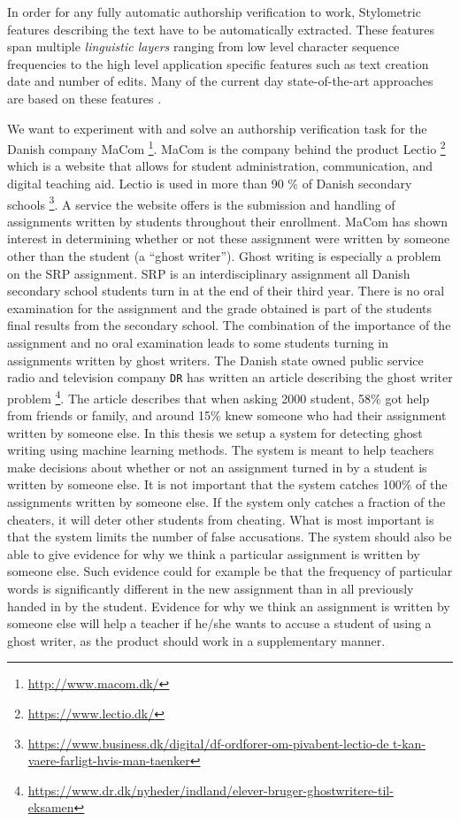 In order for any fully automatic authorship verification to work, Stylometric
features describing the text have to be automatically extracted. These features
span multiple \textit{linguistic layers} ranging from low level character
sequence frequencies to the high level application specific features such as
text creation date and number of edits. Many of the current day state-of-the-art
approaches are based on these features \citep{stamatos2009}.


We want to experiment with and solve an authorship verification task for the
Danish company MaCom \footnote{\url{http://www.macom.dk/}}. MaCom is the company
behind the product Lectio \footnote{\url{https://www.lectio.dk/}} which is a
website that allows for student administration, communication, and digital
teaching aid. Lectio is used in more than 90 \% of Danish secondary schools
\footnote{\url{https://www.business.dk/digital/df-ordforer-om-pivabent-lectio-de
t-kan-vaere-farligt-hvis-man-taenker}}. A service the website offers is the
submission and handling of assignments written by students throughout their
enrollment. MaCom has shown interest in determining whether or not these
assignment were written by someone other than the student (a ``ghost writer'').
Ghost writing is especially a problem on the \gls{SRP} assignment. \gls{SRP}
is an interdisciplinary assignment all Danish secondary school students turn
in at the end of their third year. There is no oral examination for the
assignment and the grade obtained is part of the students final results from
the secondary school. The combination of the importance of the assignment and
no oral examination leads to some students turning in assignments written by
ghost writers. The Danish state owned public service radio and television
company \texttt{DR} has written an article describing the ghost writer problem
\footnote{\url{https://www.dr.dk/nyheder/indland/elever-bruger-ghostwritere-til-
eksamen}}. The article describes that when asking 2000 student, 58\% got help
from friends or family, and around 15\% knew someone who had their assignment
written by someone else. In this thesis we setup a system for detecting ghost
writing using machine learning methods. The system is meant to help teachers
make decisions about whether or not an assignment turned in by a student is
written by someone else. It is not important that the system catches 100\% of
the assignments written by someone else. If the system only catches a fraction
of the cheaters, it will deter other students from cheating. What is most
important is that the system limits the number of false accusations. The system
should also be able to give evidence for why we think a particular assignment is
written by someone else. Such evidence could for example be that the frequency
of particular words is significantly different in the new assignment than in all
previously handed in by the student. Evidence for why we think an assignment is
written by someone else will help a teacher if he/she wants to accuse a student
of using a ghost writer, as the product should work in a supplementary manner.


